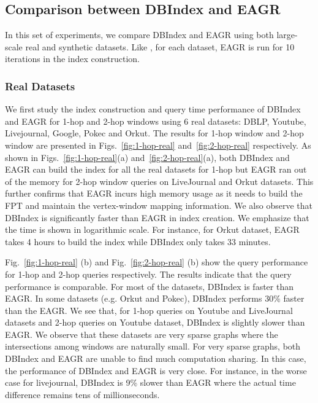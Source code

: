 \subsection{Comparison between DBIndex and EAGR}

In this set of experiments, we compare DBIndex and 
EAGR \cite{mondal2014eagr} using both large-scale real 
and synthetic datasets. Like \cite{mondal2014eagr},
for each dataset, EAGR is run for 10 
iterations in the index construction.

\subsubsection{Real Datasets} 
We first study the index construction and 
query time performance of DBIndex and EAGR for 1-hop and 2-hop windows 
using 6 real datasets: DBLP, Youtube, Livejournal, Google, Pokec and Orkut. 
The results for 1-hop window and 2-hop window are presented
in Figs.~\ref{fig:1-hop-real} and~\ref{fig:2-hop-real} 
respectively. 
As shown in Figs.~\ref{fig:1-hop-real}(a) and~\ref{fig:2-hop-real}(a), both DBIndex and EAGR can build the index for all
the real datasets for 1-hop but EAGR ran out of the memory for 2-hop window queries on LiveJournal and Orkut datasets. This further confirms that EAGR incurs 
high memory usage as it needs to build the FPT and 
maintain the vertex-window mapping information. We also observe that 
DBIndex is significantly faster than EAGR in index creation. 
We emphasize that the time is shown in logarithmic scale. 
For instance, for Orkut dataset, EAGR takes 4 hours to build the index 
while DBIndex only takes 33 minutes. 

Fig.~\ref{fig:1-hop-real} (b) and Fig.~\ref{fig:2-hop-real} (b) 
show the query performance for 1-hop and 2-hop queries respectively. 
The results indicate that the query performance is comparable. 
For most of the datasets, DBIndex is faster than EAGR.
In some datasets (e.g. Orkut and Pokec), DBIndex performs 30\% faster than the EAGR. 
We see that, for 1-hop queries on 
Youtube and LiveJournal datasets and 2-hop queries on Youtube dataset, DBIndex is slightly slower than EAGR. We observe 
that these datasets are very sparse graphs where the intersections among windows are naturally small. For very sparse graphs, 
both DBIndex and EAGR are unable to find much computation sharing. In this case, the performance of DBIndex and EAGR is very close. For instance, in the worse case for livejournal, DBIndex is 9\% slower than EAGR where the actual time difference remains tens of millionseconds.    
 
